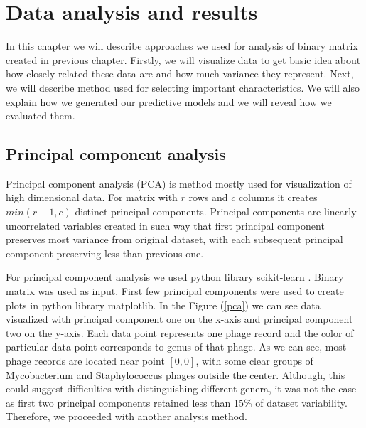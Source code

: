 \chapter{Data analysis and results}
In this chapter we will describe approaches we used for analysis of binary matrix created in previous chapter. 
Firstly, we will visualize data to get basic idea about how closely related these data are and how much variance they represent.
Next, we will describe method used for selecting important characteristics.
We will also explain how we generated our predictive models and we will reveal how we evaluated them.

\section{Principal component analysis}
Principal component analysis (PCA) is method mostly used for visualization of high dimensional data.
For matrix with $r$ rows and $c$ columns it creates $min(r-1, c)$ distinct principal components.
Principal components are linearly uncorrelated variables created in such way that first principal component preserves most variance from original dataset, with each subsequent principal component preserving less than previous one.

For principal component analysis we used python library scikit-learn \cite{sklearn}.
Binary matrix was used as input.
First few principal components were used to create plots in python library matplotlib.
In the Figure (\ref{pca}) we can see data visualized with principal component one on the x-axis and principal component two on the y-axis.
Each data point represents one phage record and the color of particular data point corresponds to genus of that phage.
As we can see, most phage records are located near point $[0, 0]$, with some clear groups of Mycobacterium and Staphylococcus phages outside the center.
Although, this could suggest difficulties with distinguishing different genera, it was not the case as first two principal components retained less than 15\% of dataset variability.
Therefore, we proceeded with another analysis method.

